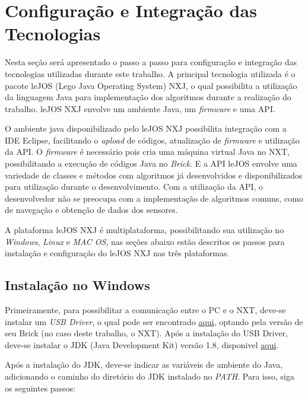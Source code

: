 \section{Configuração e Integração das Tecnologias}

Nesta seção será apresentado o passo a passo para configuração e integração das tecnologias utilizadas durante este trabalho. A principal tecnologia utilizada é o pacote leJOS (Lego Java Operating System) NXJ, o qual possibilita a utilização da linguagem Java para implementação dos algoritmos durante a realização do trabalho. leJOS NXJ envolve um ambiente Java, um \textit{firmware} e uma API. 

O ambiente java disponibilizado pelo leJOS NXJ possibilita integração com a IDE Eclipse, facilitando o \textit{upload} de códigos, atualização de \textit{firmware} e utilização da API. O \textit{firmware} é necessário pois cria uma máquina virtual Java no NXT, possibilitando a execução de códigos Java no \textit{Brick}. E a API leJOS envolve uma variedade de classes e métodos com algoritmos já desenvolvidos e disponibilizados para utilização durante o desenvolvimento. Com a utilização da API, o desenvolvedor não se preocupa com a implementação de algoritmos comuns, como de navegação e obtenção de dados dos sensores.

A plataforma leJOS NXJ é multiplataforma, possibilitando sua utilização no \textit{Windows}, \textit{Linux} e \textit{MAC OS}, nas seções abaixo estão descritos os passos para instalação e configuração do leJOS NXJ nas três plataformas.

\subsection{Instalação no Windows} %
\label{sub:instalação_no_windows}
	
	Primeiramente, para possibilitar a comunicação entre o PC e o NXT, deve-se instalar um \textit{USB Driver}, o qual pode ser encontrado \href{https://www.lego.com/en-us/mindstorms/downloads}{aqui}, optando pela versão de seu Brick (no caso deste trabalho, o NXT). Após a instalação do USB Driver, deve-se instalar o JDK (Java Development Kit) versão 1.8, disponivel \href{http://www.oracle.com/technetwork/java/}{aqui}.

	Após a instalação do JDK, deve-se indicar as variáveis de ambiente do Java, adicionando o caminho do diretório do JDK instalado no \textit{PATH}. Para isso, siga os seguintes passos:

